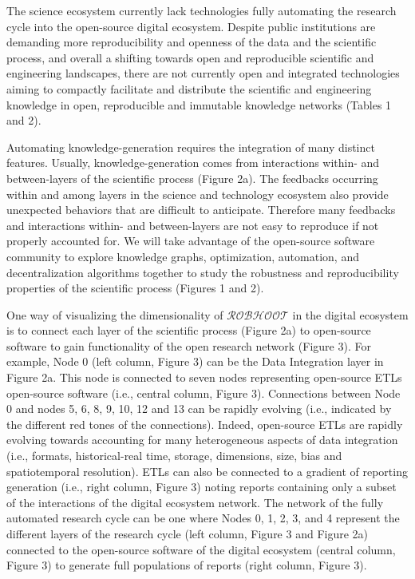 \documentclass[12pt, a4paper]{article} %
\begin{document}
The science ecosystem currently lack technologies fully automating the
research cycle into the open-source digital ecosystem. Despite public
institutions are demanding more reproducibility and openness of the
data and the scientific process, and overall a shifting towards open
and reproducible scientific and engineering landscapes, there are not
currently open and integrated technologies aiming to compactly
facilitate and distribute the scientific and engineering knowledge in
open, reproducible and immutable knowledge networks (Tables 1 and 2).
  
  Automating knowledge-generation requires the integration of many
  distinct features. Usually, knowledge-generation comes from
  interactions within- and between-layers of the scientific process
  (Figure 2a). The feedbacks occurring within and among layers in the
  science and technology ecosystem also provide unexpected behaviors
  that are difficult to anticipate. Therefore many feedbacks and
  interactions within- and between-layers are not easy to reproduce if
  not properly accounted for. We will take advantage of the
  open-source software community to explore knowledge graphs,
  optimization, automation, and decentralization algorithms together
  to study the robustness and reproducibility properties of the
  scientific process (Figures 1 and 2).

  One way of visualizing the dimensionality of $\mathcal{ROBHOOT}$ in
  the digital ecosystem is to connect each layer of the scientific
  process (Figure 2a) to open-source software to gain functionality of
  the open research network (Figure 3). For example, Node 0 (left
  column, Figure 3) can be the Data Integration layer in Figure
  2a. This node is connected to seven nodes representing open-source
  ETLs open-source software (i.e., central column, Figure
  3). Connections between Node 0 and nodes 5, 6, 8, 9, 10, 12 and 13
  can be rapidly evolving (i.e., indicated by the different red tones
  of the connections). Indeed, open-source ETLs are rapidly evolving
  towards accounting for many heterogeneous aspects of data
  integration (i.e., formats, historical-real time, storage,
  dimensions, size, bias and spatiotemporal resolution). ETLs can also
  be connected to a gradient of reporting generation (i.e., right
  column, Figure 3) noting reports containing only a subset of the
  interactions of the digital ecosystem network. The network of the
  fully automated research cycle can be one where Nodes 0, 1, 2, 3,
  and 4 represent the different layers of the research cycle (left
  column, Figure 3 and Figure 2a) connected to the open-source
  software of the digital ecosystem (central column, Figure 3) to
  generate full populations of reports (right column, Figure 3).
\end{document}
